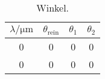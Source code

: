 \begin{table} \caption{Winkel.}
    \label{tab:skaliert}
    \centering
    \begin{tabular}{cccc}
        \toprule
        {$\lambda / \si{\micro\meter}$} & {$\theta_\text{rein}$} & {$\theta_1$} & {$\theta_2$} \\
        \midrule
        0 & 0 & 0 & 0 \\
        0 & 0 & 0 & 0 \\
        \bottomrule
    \end{tabular}
\end{table}